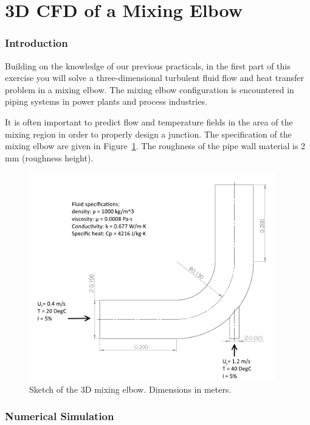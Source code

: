 \documentclass[12pts,a4paper,amsmath,amssymb,floatfix]{article}%
\begin{document}
\part{ 3D CFD of a Mixing Elbow}

\section{Introduction}
Building on the knowledge of our previous practicals, in the first part of this exercise you will solve a three-dimensional turbulent fluid flow and heat transfer problem in a mixing elbow. The mixing elbow configuration is encountered in piping systems in power plants and process industries. 

It is often important to predict flow and temperature fields in the area of the mixing region in order to properly design a junction. The specification of the mixing elbow are given in Figure~\ref{Design1:Sketch1}. The roughness of the pipe wall material is 2\,mm (roughness height). 
\begin{figure}[H]
\begin{center}
\includegraphics[width=0.95\textwidth,clip]{./Pics/elbow_sketch.png}
\end{center}
\caption{Sketch of the 3D mixing elbow. Dimensions in meters.}\label{Design1:Sketch1}
\end{figure}

\section{Numerical Simulation}
\end{document}

